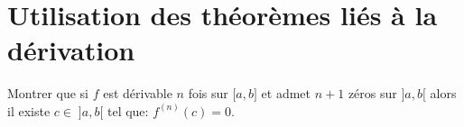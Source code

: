 \documentclass[a4paper, 11pt,reqno]{article}
\begin{document}
\vspace{1cm}

\noindent\section{\large{Utilisation des th\'eor\`emes li\'es \`a la d\'erivation}}
\begin{exercice}  \;
	Montrer que si $f$ est d\'erivable $n$ fois sur $\lbrack a,b\rbrack$ et admet $n+1$ z\'eros sur $\rbrack a,b\lbrack$ alors il existe $c\in \; \rbrack a,b\lbrack$ tel que: $f^{(n)}(c)=0$.
\end{exercice}
\end{document}
